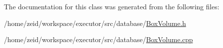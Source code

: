 \label{class_box_volume_a0ae9abf069ea97258cd7bf2ccdddce2b}


The documentation for this class was generated from the following files:\begin{DoxyCompactItemize}
\item 
/home/zeid/workspace/executor/src/database/\hyperlink{_box_volume_8h}{BoxVolume.h}\item 
/home/zeid/workspace/executor/src/database/\hyperlink{_box_volume_8cpp}{BoxVolume.cpp}\end{DoxyCompactItemize}
